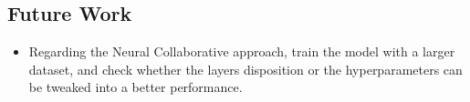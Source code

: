
\subsection*{Future Work}
\begin{itemize}
    \item Regarding the Neural Collaborative approach, train the model with a larger dataset, and check whether the layers disposition or the hyperparameters can be tweaked into a better performance.
\end{itemize}